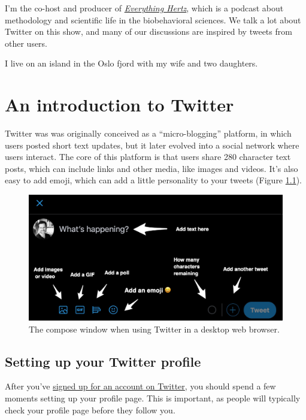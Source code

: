 \documentclass[]{book}
\begin{document}
I'm the co-host and producer of \href{https://everythinghertz.com/}{\emph{Everything Hertz}}, which is a podcast about methodology and scientific life in the biobehavioral sciences. We talk a lot about Twitter on this show, and many of our discussions are inspired by tweets from other users.

I live on an island in the Oslo fjord with my wife and two daughters.

\hypertarget{beginner}{%
\chapter{An introduction to Twitter}\label{beginner}}

Twitter was was originally conceived as a ``micro-blogging'' platform, in which users posted short text updates, but it later evolved into a social network where users interact. The core of this platform is that users share 280 character text posts, which can include links and other media, like images and videos. It's also easy to add emoji, which can add a little personality to your tweets (Figure \ref{fig:compose}).

\begin{figure}

{\centering \includegraphics[width=0.8\linewidth]{images/compose} 

}

\caption{The compose window when using Twitter in a desktop web browser.}\label{fig:compose}
\end{figure}

\hypertarget{setting-up-your-twitter-profile}{%
\section{Setting up your Twitter profile}\label{setting-up-your-twitter-profile}}

After you've \href{https://twitter.com/}{signed up for an account on Twitter}, you should spend a few moments setting up your profile page. This is important, as people will typically check your profile page before they follow you.
\end{document}
